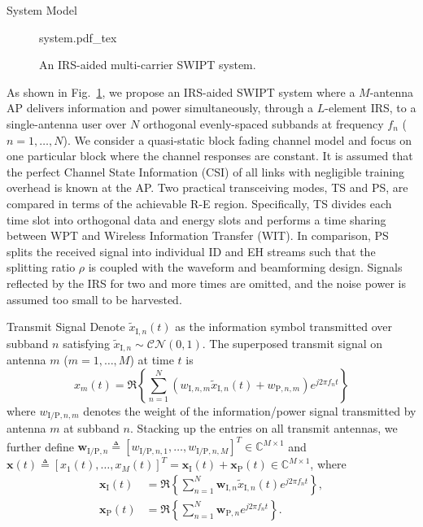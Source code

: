 \documentclass[journal]{IEEEtran}
\begin{document}
	\begin{section}{System Model}\label{se:system_model}
		\begin{figure}[!t]
			\centering
			\def\svgwidth{0.9\columnwidth}
			{system.pdf_tex}
			\caption{An IRS-aided multi-carrier SWIPT system.}
			\label{fi:system}
		\end{figure}

		As shown in Fig.~\ref{fi:system}, we propose an IRS-aided SWIPT system where a $M$-antenna AP delivers information and power simultaneously, through a $L$-element IRS, to a single-antenna user over $N$ orthogonal evenly-spaced subbands at frequency $f_n$ ($n=1,\dots,N$). We consider a quasi-static block fading channel model and focus on one particular block where the channel responses are constant. It is assumed that the perfect Channel State Information (CSI) of all links with negligible training overhead is known at the AP. Two practical transceiving modes, TS and PS, are compared in terms of the achievable R-E region. Specifically, TS divides each time slot into orthogonal data and energy slots and performs a time sharing between WPT and Wireless Information Transfer (WIT). In comparison, PS splits the received signal into individual ID and EH streams such that the splitting ratio $\rho$ is coupled with the waveform and beamforming design. Signals reflected by the IRS for two and more times are omitted, and the noise power is assumed too small to be harvested.


		\begin{subsection}{Transmit Signal}
			Denote $\tilde{x}_{\mathrm{I},n}(t)$ as the information symbol transmitted over subband $n$ satisfying $\tilde{x}_{\mathrm{I},n}\sim\mathcal{CN}(0,1)$. The superposed transmit signal on antenna $m$ ($m=1,\dots,M$) at time $t$ is
			\begin{equation}\label{eq:x_m}
				x_m(t)=\Re\left\{\sum_{n=1}^N\left({w_{\mathrm{I},n,m}\tilde{x}_{\mathrm{I},n}(t)}+w_{\mathrm{P},n,m}\right){e^{j2{\pi}{f_n}{t}}}\right\}
			\end{equation}
			where $w_{\mathrm{I/P},n,m}$ denotes the weight of the information/power signal transmitted by antenna $m$ at subband $n$. Stacking up the entries on all transmit antennas, we further define $\boldsymbol{w}_{\mathrm{I/P},n} \triangleq [w_{\mathrm{I/P},n,1},\dots,w_{\mathrm{I/P},n,M}]^T \in \mathbb{C}^{M \times 1}$ and $\boldsymbol{x}(t) \triangleq [x_1(t),\dots,x_M(t)]^T=\boldsymbol{x}_{\mathrm{I}}(t)+\boldsymbol{x}_{\mathrm{P}}(t) \in \mathbb{C}^{M \times 1}$, where
			\begin{align}
				\boldsymbol{x}_{\mathrm{I}}(t) &= \Re{\left\{\sum_{n=1}^N\boldsymbol{w}_{\mathrm{I},n}\tilde{x}_{\mathrm{I},n}(t){e^{j2{\pi}{f_n}{t}}}\right\}},\label{eq:x_I}\\
				\boldsymbol{x}_{\mathrm{P}}(t) &= \Re{\left\{\sum_{n=1}^N\boldsymbol{w}_{\mathrm{P},n}{e^{j2{\pi}{f_n}{t}}}\right\}}.\label{eq:x_P}
			\end{align}
		\end{subsection}



\end{section}
\end{document}
